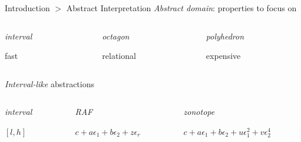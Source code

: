 \documentclass[11pt]{beamer}
\begin{document}
\begin{frame}{Introduction $>$ Abstract Interpretation}
\emph{Abstract domain}: properties to focus on
\vspace{0.5em}
\begin{columns}
 \begin{column}{0.32\textwidth}
  \centering
  \emph{interval}
  
  
  
  fast
 \end{column}
 
 \begin{column}{0.32\textwidth}
  \centering
  \emph{octagon}
  
  
  
  relational
 \end{column}
 
 \begin{column}{0.32\textwidth}
  \centering
  \emph{polyhedron}
  
  
  
  expensive
 \end{column}
\end{columns}
\vspace{1em}

\emph{Interval-like} abstractions
\vspace{0.5em}
\begin{columns}
 \begin{column}{0.32\textwidth}
  \centering
  \emph{interval}
  
  \vspace{0.5em}
  
  
  $[l, h]$
 \end{column}
 
 \begin{column}{0.32\textwidth}
  \centering
  \emph{RAF}
  
  \vspace{0.5em}
  
  
  $c + a\epsilon_1 + b\epsilon_2 + z\epsilon_r$
 \end{column}
 
 \begin{column}{0.32\textwidth}
  \centering
  \emph{zonotope}
  
  \vspace{0.5em}
  
  
  $c + a\epsilon_1 + b\epsilon_2 + u\epsilon_1^2 + v\epsilon_2^4$
 \end{column}
\end{columns}
\end{frame}
\end{document}
